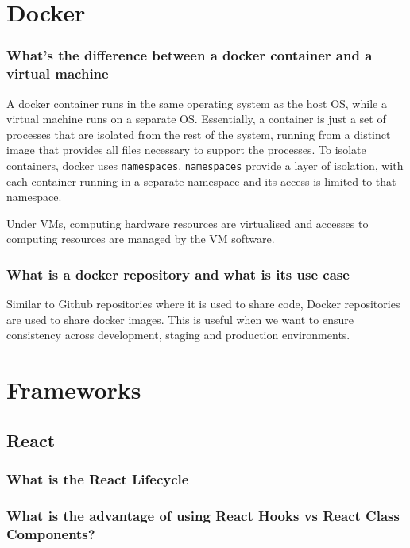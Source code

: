 \documentclass[12pt, a4paper]{article}
\newcommand{\code}[1]{\texttt{#1}}
\begin{document}
\pagebreak


\pagebreak

\section*{Docker}
\subsubsection*{What's the difference between a docker container and a virtual machine}
A docker container runs in the same operating system as the host OS, while a virtual machine runs on a separate OS.
Essentially, a container is just a set of processes that are isolated from the rest of the system, running from a distinct image that provides all files necessary to support the processes.
To isolate containers, docker uses \code{namespaces}. 
\code{namespaces} provide a layer of isolation, with each container running in a separate namespace and its access is limited to that namespace.

Under VMs, computing hardware resources are virtualised and accesses to computing resources are managed by the VM software.

\subsubsection*{What is a docker repository and what is its use case}
Similar to Github repositories where it is used to share code, Docker repositories are used to share docker images.
This is useful when we want to ensure consistency across development, staging and production environments.

\pagebreak

\section*{Frameworks}
\subsection*{React}
\subsubsection*{What is the React Lifecycle}
\subsubsection*{What is the advantage of using React Hooks vs React Class Components?}
\end{document}
